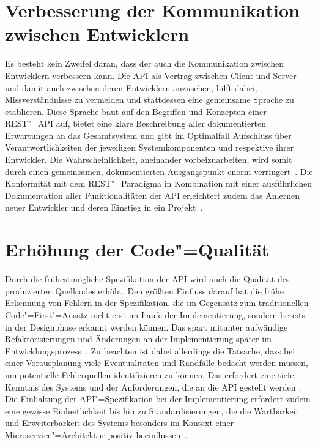 \section{Verbesserung der Kommunikation zwischen Entwicklern}
Es besteht kein Zweifel daran, dass der \AFA auch die Kommunikation zwischen Entwicklern verbessern kann.
Die \ac{API} als Vertrag zwischen Client und Server und damit auch zwischen deren Entwicklern anzusehen, hilft dabei, Missverständnisse zu vermeiden und stattdessen eine gemeinsame Sprache zu etablieren. Diese Sprache baut auf den Begriffen und Konzepten einer \acs{REST}"=\acs{API} auf, bietet eine klare Beschreibung aller dokumentierten Erwartungen an das Gesamtsystem und gibt im Optimalfall Aufschluss über Verantwortlichkeiten der jeweiligen Systemkomponenten und respektive ihrer Entwickler.
Die Wahrscheinlichkeit, aneinander vorbeizuarbeiten, wird somit durch einen gemeinsamen, dokumentierten Ausgangspunkt enorm verringert~\cite[1628]{cha21}.
Die Konformität mit dem \ac{REST}"=Paradigma in Kombination mit einer ausführlichen Dokumentation aller Funktionalitäten der \ac{API} erleichtert zudem das Anlernen neuer Entwickler und deren Einstieg in ein Projekt~\cite[355]{de23}.

\section{Erhöhung der Code"=Qualität}
Durch die frühestmögliche Spezifikation der \ac{API} wird auch die Qualität des produzierten Quellcodes erhöht.
Den größten Einfluss darauf hat die frühe Erkennung von Fehlern in der Spezifikation, die im Gegensatz zum traditionellen Code"=First"=Ansatz nicht erst im Laufe der Implementierung, sondern bereits in der Designphase erkannt werden können.
Das spart mitunter aufwändige Refaktorisierungen und Änderungen an der Implementierung später im Entwicklungsprozess~\cite{vol22}.
Zu beachten ist dabei allerdings die Tatsache, dass bei einer Vorausplanung viele Eventualitäten und Randfälle bedacht werden müssen, um potentielle Fehlerquellen identifizieren zu können. Das erfordert eine tiefe Kenntnis des Systems und der Anforderungen, die an die \ac{API} gestellt werden~\cite[362]{de23}. %
Die Einhaltung der \ac{API}"=Spezifikation bei der Implementierung erfordert zudem eine gewisse Einheitlichkeit bis hin zu Standardisierungen, die die Wartbarkeit und Erweiterbarkeit des Systems besonders im Kontext einer Microservice"=Architektur positiv beeinflussen~\cite[1628]{cha21}.